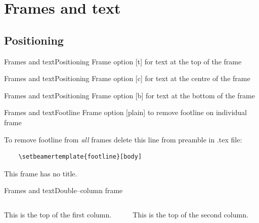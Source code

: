 \documentclass[aspectratio=169, 11pt]{beamer}
\begin{document}
\section{Frames and text}
\subsection{Positioning}
\begin{frame}[t]{Frames and text}{Positioning}
Frame option [t] for text at the top of the frame
\end{frame}

\begin{frame}[c]{Frames and text}{Positioning}
Frame option [c] for text at the centre of the frame
\end{frame}

\begin{frame}[b]{Frames and text}{Positioning}
Frame option [b] for text at the bottom of the frame
\end{frame}


\begin{frame}{Frames and text}{Footline}   %
\vspace{2.1mm} %
Frame option [plain] to remove footline on individual frame

\vspace{25pt}
To remove footline from \emph{all} frames delete this line from preamble in .tex file: 
\begin{verbatim}
    \setbeamertemplate{footline}[body]
\end{verbatim}
\end{frame}

\begin{frame}
	This frame has no title.
\end{frame}

\begin{frame}{Frames and text}{Double--column frame}
	\begin{columns}[t]
		\begin{column}{.5\textwidth}
			This is the top of the first column.	
		\end{column}
		\begin{column}{.5\textwidth}
			This is the top of the second column.
		\end{column}
	\end{columns}	
\end{frame}
\end{document}
